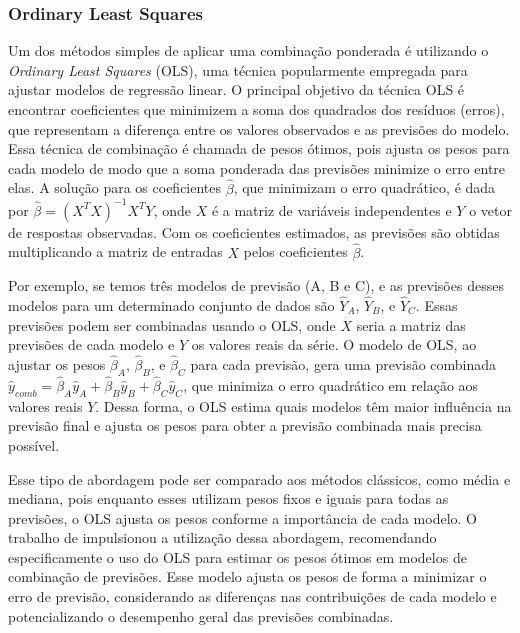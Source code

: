 \subsubsection{Ordinary Least Squares}
Um dos métodos simples de aplicar uma combinação ponderada é utilizando o \textit{Ordinary Least Squares} (OLS), uma técnica popularmente empregada para ajustar modelos de regressão linear. O principal objetivo da técnica OLS é encontrar coeficientes que minimizem a soma dos quadrados dos resíduos (erros), que representam a diferença entre os valores observados e as previsões do modelo. Essa técnica de combinação é chamada de pesos ótimos, pois ajusta os pesos para cada modelo de modo que a soma ponderada das previsões minimize o erro entre elas. A solução para os coeficientes \( \hat{\beta} \), que minimizam o erro quadrático, é dada por \( \hat{\beta} = (X^T X)^{-1} X^T Y \), onde \( X \) é a matriz de variáveis independentes e \( Y \) o vetor de respostas observadas. Com os coeficientes estimados, as previsões são obtidas multiplicando a matriz de entradas \( X \) pelos coeficientes \( \hat{\beta} \).

Por exemplo, se temos três modelos de previsão (A, B e C), e as previsões desses modelos para um determinado conjunto de dados são \( \hat{Y}_A \), \( \hat{Y}_B \), e \( \hat{Y}_C \). Essas previsões podem ser combinadas usando o OLS, onde \( X \) seria a matriz das previsões de cada modelo e \( Y \) os valores reais da série. O modelo de OLS, ao ajustar os pesos \( \hat{\beta}_A \), \( \hat{\beta}_B \), e \( \hat{\beta}_C \) para cada previsão, gera uma previsão combinada \( \hat{y}_{comb} = \hat{\beta}_A \hat{y}_A + \hat{\beta}_B \hat{y}_B + \hat{\beta}_C \hat{y}_C \), que minimiza o erro quadrático em relação aos valores reais \( Y \). Dessa forma, o OLS estima quais modelos têm maior influência na previsão final e ajusta os pesos para obter a previsão combinada mais precisa possível.

Esse tipo de abordagem pode ser comparado aos métodos clássicos, como média e mediana, pois enquanto esses utilizam pesos fixos e iguais para todas as previsões, o OLS ajusta os pesos conforme a importância de cada modelo. O trabalho de \cite{granger1984} impulsionou a utilização dessa abordagem, recomendando especificamente o uso do OLS para estimar os pesos ótimos em modelos de combinação de previsões. Esse modelo ajusta os pesos de forma a minimizar o erro de previsão, considerando as diferenças nas contribuições de cada modelo e potencializando o desempenho geral das previsões combinadas.


